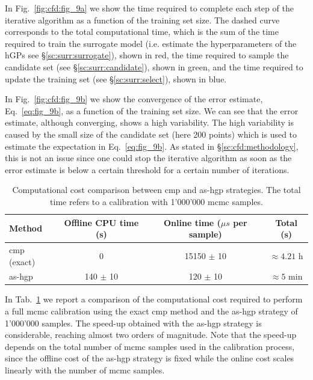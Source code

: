 In Fig.~\ref{fig:cfd:fig_9a} we show the time required to complete each step of the iterative algorithm as a function of the training set size. 
The dashed curve corresponds to the total computational time, which is the sum of the time required to train the surrogate model (i.e. estimate the hyperparameters of the hGPs see \S\ref{sc:surr:surrogate}), shown in red, the time required to sample the candidate set (see \S\ref{sc:surr:candidate}), shown in green, and the time required to update the training set (see \S\ref{sc:surr:select}), shown in blue.

\smallskip
In Fig.~\ref{fig:cfd:fig_9b} we show the convergence of the error estimate, Eq.~\eqref{eq:fig_9b}, as a function of the training set size. We can see that the error estimate, although converging, shows a high variability. The high variability is caused by the small size of the candidate set (here 200 points) which is used to estimate the expectation in Eq.~\eqref{eq:fig_9b}. As stated in \S\ref{sc:cfd:methodology}, this is not an issue since one could stop the iterative algorithm as soon as the error estimate is below a certain threshold for a certain number of iterations.

\begin{table}[htbp]
  \centering
  \begin{tabular}{|l|c|c|c|}
    \hline
    Method & Offline CPU time (s) & Online time ($\mu s$ per sample) & Total (s)\\
    \hline
    \gls{cmp} (exact) & 0 & 15150 $\pm$ 10 & $\approx 4.21$ h \\
    \hline
    \gls{as}-\gls{hgp} & 140 $\pm$ 10 & 120 $\pm$ 10 & $\approx 5$ min \\
    \hline
  \end{tabular}
    \caption{Computational cost comparison between \gls{cmp} and \gls{as}-\gls{hgp} strategies. The total time refers to a calibration with 1'000'000 \gls{mcmc} samples.}
    \label{tab:cfd:cost_comparison}
\end{table}

\smallskip
In Tab.~\ref{tab:cfd:cost_comparison} we report a comparison of the computational cost required to perform a full \gls{mcmc} calibration using the exact \gls{cmp} method and the \gls{as}-\gls{hgp} strategy of 1'000'000 samples. The speed-up obtained with the \gls{as}-\gls{hgp} strategy is considerable, reaching almost two orders of magnitude. Note that the speed-up depends on the total number of \gls{mcmc} samples used in the calibration process, since the offline cost of the \gls{as}-\gls{hgp} strategy is fixed while the online cost scales linearly with the number of \gls{mcmc} samples.



